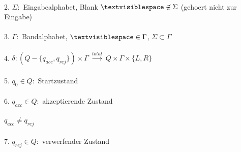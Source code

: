 \documentclass[18pt,a4paper]{scrreprt}
\newcommand{\tab}{\hspace*{2em}}
\begin{document}
\\
2. $\Sigma:$ Eingabealphabet, Blank $\textvisiblespace \not \in \Sigma$ (gehoert nicht zur Eingabe)\\
\\
3. $\Gamma:$ Bandalphabet, $\textvisiblespace \in \Gamma$, $\Sigma \subset \Gamma$\\
\\
4. $\delta: (Q-\{q_{acc}, q_{rej}\}) \times \Gamma \:\xrightarrow{total}\: Q \times \Gamma \times \{L, R\}$\\
\\
5. $q_0 \in Q:$ Startzustand\\
\\
6. $q_{acc} \in Q:$ akzeptierende Zustand\\
\\
\tab\tab $q_{acc} \neq q_{rej}$\\
\\
7. $q_{rej} \in Q:$ verwerfender Zustand\\
\\
\end{document}
